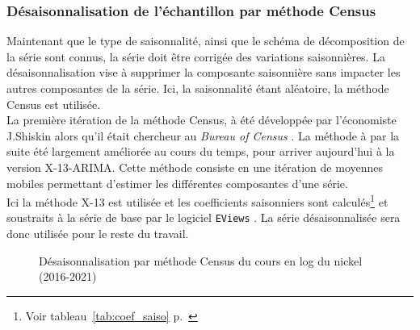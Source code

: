 \subsubsection{Désaisonnalisation de l'échantillon par méthode Census}
Maintenant que le type de saisonnalité, ainsi que le schéma de décomposition de la série sont connus, la série doit être corrigée des variations saisonnières. La 
désaisonnalisation vise à supprimer la composante saisonnière sans impacter les autres composantes de la série. Ici, la saisonnalité étant aléatoire, la méthode Census
est utilisée.\\[11pt]
La première itération de la méthode Census, à été développée par l'économiste J.Shiskin alors qu'il était chercheur au \textit{Bureau of Census} . La méthode à par la 
suite été largement améliorée au cours du temps, pour arriver aujourd'hui à la version X-13-ARIMA. Cette méthode consiste en une itération de moyennes mobiles permettant 
d'estimer les différentes composantes d'une série.\\[11pt]
Ici la méthode X-13 est utilisée et les coefficients saisonniers sont calculés\footnote{Voir tableau~\ref{tab:coef_saiso} p.~\pageref{tab:coef_saiso}} et soustraits à la série de base par le logiciel \texttt{EViews} . La série désaisonnalisée sera donc utilisée pour le reste du travail.
\begin{figure}[H]
    \centering
    
    \caption{Désaisonnalisation par méthode Census du cours en log du nickel (2016-2021)}
\end{figure}